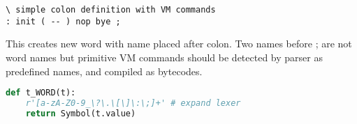 \clearpage{}

\begin{lstlisting}[language=Forth]
\ simple colon definition with VM commands
: init ( -- ) nop bye ;
\end{lstlisting}

\noindent This  creates new word with name placed after
colon. Two names before ; are not word names but primitive VM commands should be
detected by parser as predefined names, and compiled as bytecodes.

\begin{lstlisting}[language=Python]
def t_WORD(t):
    r'[a-zA-Z0-9_\?\.\[\]\:\;]+' # expand lexer
    return Symbol(t.value)
\end{lstlisting}
    
